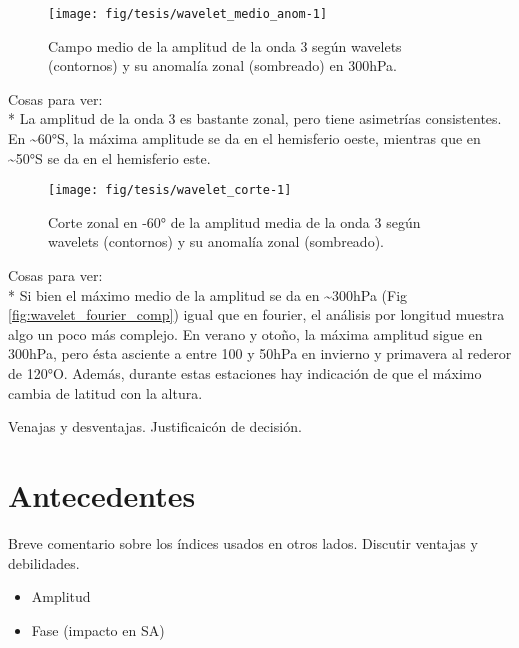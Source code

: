 \documentclass[spanish,a4paper]{book}
\providecommand{\tightlist}{%
  \setlength{\itemsep}{0pt}\setlength{\parskip}{0pt}}
\begin{document}
\begin{figure}

{\centering \texttt{[image: fig/tesis/wavelet\_medio\_anom-1]} 

}

\caption{Campo medio de la amplitud de la onda 3 según wavelets (contornos) y su anomalía zonal (sombreado) en 300hPa.}\label{fig:wavelet_medio_anom}
\end{figure}

Cosas para ver:\\
* La amplitud de la onda 3 es bastante zonal, pero tiene asimetrías
consistentes. En \textasciitilde{}60°S, la máxima amplitude se da en el
hemisferio oeste, mientras que en \textasciitilde{}50°S se da en el
hemisferio este.

\begin{figure}

{\centering \texttt{[image: fig/tesis/wavelet\_corte-1]} 

}

\caption{Corte zonal en -60° de la amplitud media de la onda 3 según wavelets (contornos) y su anomalía zonal (sombreado).}\label{fig:wavelet_corte}
\end{figure}

Cosas para ver:\\
* Si bien el máximo medio de la amplitud se da en
\textasciitilde{}300hPa (Fig \autoref{fig:wavelet_fourier_comp}) igual
que en fourier, el análisis por longitud muestra algo un poco más
complejo. En verano y otoño, la máxima amplitud sigue en 300hPa, pero
ésta asciente a entre 100 y 50hPa en invierno y primavera al rederor de
120°O. Además, durante estas estaciones hay indicación de que el máximo
cambia de latitud con la altura.

Venajas y desventajas. Justificaicón de decisión.

\section{Antecedentes}\label{antecedentes}

Breve comentario sobre los índices usados en otros lados. Discutir
ventajas y debilidades.

\begin{itemize}
\tightlist
\item
  Amplitud
\item
  Fase (impacto en SA)
\end{itemize}
\end{document}
